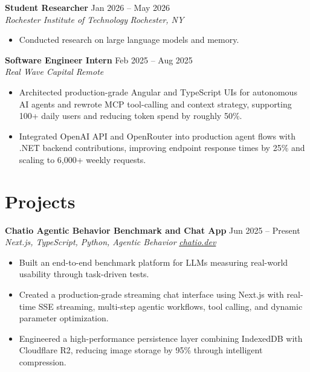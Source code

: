 \documentclass[10pt,letterpaper]{article}
\newif\ifresumeFirstRole
\newcommand{\resumeRole}[4]{%
  \ifresumeFirstRole
    \global\resumeFirstRolefalse
  \else
    \vspace{0pt plus 1fill}%
  \fi
  \textbf{#1} \hfill #2\\
  \textit{#3} \hfill \textit{#4}
}
\begin{document}
\resumeRole{Student Researcher}{Jan 2026 -- May 2026}{Rochester Institute of Technology}{Rochester, NY}
\begin{itemize}
  \item Conducted research on large language models and memory.
\end{itemize}

\resumeRole{Software Engineer Intern}{Feb 2025 -- Aug 2025}{Real Wave Capital}{Remote}
\begin{itemize}
  \item Architected production-grade Angular and TypeScript UIs for autonomous AI agents and rewrote MCP tool-calling and context strategy, supporting 100+ daily users and reducing token spend by roughly 50\%.
  \item Integrated OpenAI API and OpenRouter into production agent flows with .NET backend contributions, improving endpoint response times by 25\% and scaling to 6,000+ weekly requests.
\end{itemize}

\section*{Projects}
\resumeRole{Chatio Agentic Behavior Benchmark and Chat App}{Jun 2025 -- Present}{Next.js, TypeScript, Python, Agentic Behavior}{\href{https://chatio.dev}{chatio.dev}}
\begin{itemize}
  \item Built an end-to-end benchmark platform for LLMs measuring real-world usability through task-driven tests.
  \item Created a production-grade streaming chat interface using Next.js with real-time SSE streaming, multi-step agentic workflows, tool calling, and dynamic parameter optimization.
  \item Engineered a high-performance persistence layer combining IndexedDB with Cloudflare R2, reducing image storage by 95\% through intelligent compression.
\end{itemize}
\end{document}
